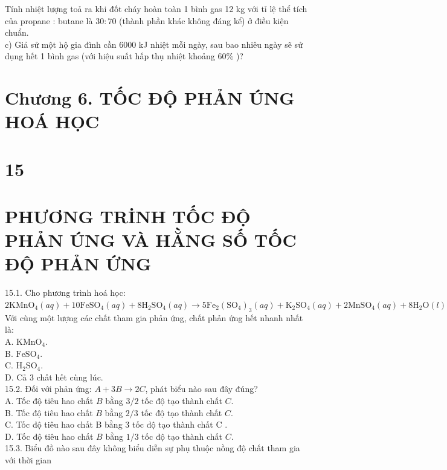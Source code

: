 \documentclass[10pt]{article}
\begin{document}
Tính nhiệt lượng toả ra khi đốt cháy hoàn toàn 1 bình gas 12 kg với tỉ lệ thể tích của propane : butane là $30: 70$ (thành phần khác không đáng kể) ở điều kiện chuẩn.\\
c) Giả sử một hộ gia đình cần 6000 kJ nhiệt mỗi ngày, sau bao nhiêu ngày sẽ sử dụng hết 1 bình gas (với hiệu suất hấp thụ nhiệt khoảng $60 \%$ )?

\section*{Chương 6. TỐC ĐỘ PHẢN ÚNG HOÁ HỌC}
\section*{15}
\section*{PHƯƠNG TRİNH TỐC ĐỘ PHẢN ÚNG VÀ HẰNG SỐ TỐC ĐỘ PHẢN ỨNG}
15.1. Cho phương trình hoá học:\\
$2 \mathrm{KMnO}_{4}(a q)+10 \mathrm{FeSO}_{4}(a q)+8 \mathrm{H}_{2} \mathrm{SO}_{4}(a q) \rightarrow 5 \mathrm{Fe}_{2}\left(\mathrm{SO}_{4}\right)_{3}(a q)+\mathrm{K}_{2} \mathrm{SO}_{4}(a q)+2 \mathrm{MnSO}_{4}(a q)+8 \mathrm{H}_{2} \mathrm{O}(l)$\\
Với cùng một lượng các chất tham gia phản ứng, chất phản ứng hết nhanh nhất là:\\
A. $\mathrm{KMnO}_{4}$.\\
B. $\mathrm{FeSO}_{4}$.\\
C. $\mathrm{H}_{2} \mathrm{SO}_{4}$.\\
D. Cả 3 chất hết cùng lúc.\\
15.2. Đối với phản ứng: $A+3 B \rightarrow 2 C$, phát biểu nào sau đây đúng?\\
A. Tốc độ tiêu hao chất $B$ bằng $3 / 2$ tốc độ tạo thành chất $C$.\\
B. Tốc độ tiêu hao chất $B$ bằng $2 / 3$ tốc độ tạo thành chất $C$.\\
C. Tốc độ tiêu hao chất B bằng 3 tốc độ tạo thành chất C .\\
D. Tốc độ tiêu hao chất $B$ bằng $1 / 3$ tốc độ tạo thành chất $C$.\\
15.3. Biểu đồ nào sau đây không biểu diễn sự phụ thuộc nồng độ chất tham gia với thời gian
\end{document}

